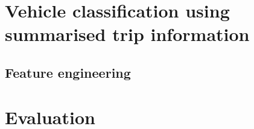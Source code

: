 \section{Vehicle classification using summarised trip information}
\label{s.classification}
\subsection{Feature engineering}

\section{Evaluation}
\label{s.results}